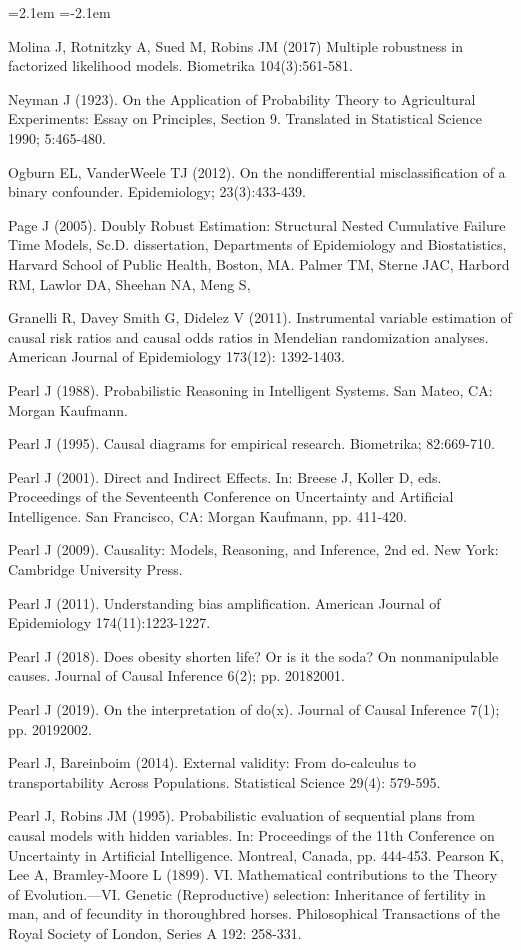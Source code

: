 \begin{list}{}{\leftmargin=2.1em   \itemindent=-2.1em \parsep=0pt \itemsep=1.6pt \topsep=4pt \rightmargin=0pt}
\item Molina J, Rotnitzky A, Sued M, Robins JM (2017) Multiple robustness in factorized likelihood models. Biometrika 104(3):561-581.
\item Neyman J (1923). On the Application of Probability Theory to Agricultural Experiments: Essay on Principles, Section 9. Translated in Statistical Science 1990; 5:465-480.
\item Ogburn EL, VanderWeele TJ (2012). On the nondifferential misclassification of a binary confounder. Epidemiology; 23(3):433-439.
\item Page J (2005). Doubly Robust Estimation: Structural Nested Cumulative Failure Time Models, Sc.D. dissertation, Departments of Epidemiology and Biostatistics, Harvard School of Public Health, Boston, MA. Palmer TM, Sterne JAC, Harbord RM, Lawlor DA, Sheehan NA, Meng S,
\item Granelli R, Davey Smith G, Didelez V (2011). Instrumental variable estimation of causal risk ratios and causal odds ratios in Mendelian randomization analyses. American Journal of Epidemiology 173(12): 1392-1403.
\item Pearl J (1988). Probabilistic Reasoning in Intelligent Systems. San Mateo, CA: Morgan Kaufmann.
\item Pearl J (1995). Causal diagrams for empirical research. Biometrika; 82:669-710.
\item Pearl J (2001). Direct and Indirect Effects. In: Breese J, Koller D, eds. Proceedings of the Seventeenth Conference on Uncertainty and Artificial Intelligence. San Francisco, CA: Morgan Kaufmann, pp. 411-420.
\item Pearl J (2009). Causality: Models, Reasoning, and Inference, 2nd ed. New York: Cambridge University Press.
\item Pearl J (2011). Understanding bias amplification. American Journal of Epidemiology 174(11):1223-1227.
\item Pearl J (2018). Does obesity shorten life? Or is it the soda? On nonmanipulable causes. Journal of Causal Inference 6(2); pp. 20182001.
\item Pearl J (2019). On the interpretation of do(x). Journal of Causal Inference 7(1); pp. 20192002.
\item Pearl J, Bareinboim (2014). External validity: From do-calculus to transportability Across Populations. Statistical Science 29(4): 579-595.
\item Pearl J, Robins JM (1995). Probabilistic evaluation of sequential plans from causal models with hidden variables. In: Proceedings of the 11th Conference on Uncertainty in Artificial Intelligence. Montreal, Canada, pp. 444-453. Pearson K, Lee A, Bramley-Moore L (1899). VI. Mathematical contributions to the Theory of Evolution.—VI. Genetic (Reproductive) selection: Inheritance of fertility in man, and of fecundity in thoroughbred horses. Philosophical Transactions of the Royal Society of London, Series A 192: 258-331.

\end{list}
